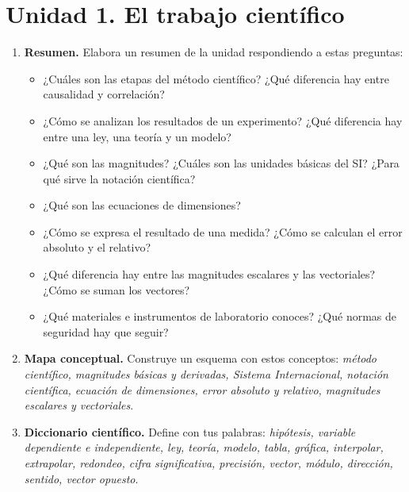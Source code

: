 
\section{Unidad 1. El trabajo científico}

\begin{enumerate}[label=\numberballred]
    \item \textbf{Resumen.} Elabora un resumen de la unidad respondiendo a estas preguntas:
    \begin{itemize}
        \item ¿Cuáles son las etapas del método científico? ¿Qué diferencia hay entre causalidad y correlación?
        \item ¿Cómo se analizan los resultados de un experimento? ¿Qué diferencia hay entre una ley, una teoría y un modelo?
        \item ¿Qué son las magnitudes? ¿Cuáles son las unidades básicas del SI? ¿Para qué sirve la notación científica?
        \item ¿Qué son las ecuaciones de dimensiones?
        \item ¿Cómo se expresa el resultado de una medida? ¿Cómo se calculan el error absoluto y el relativo?
        \item ¿Qué diferencia hay entre las magnitudes escalares y las vectoriales? ¿Cómo se suman los vectores?
        \item ¿Qué materiales e instrumentos de laboratorio conoces? ¿Qué normas de seguridad hay que seguir?
    \end{itemize}
    \item \textbf{Mapa conceptual.} Construye un esquema con estos conceptos: \emph{método científico, magnitudes básicas y derivadas, Sistema Internacional, notación científica, ecuación de dimensiones, error absoluto y relativo, magnitudes escalares y vectoriales}.
    \item \textbf{Diccionario científico.} Define con tus palabras: \emph{hipótesis, variable dependiente e independiente, ley, teoría, modelo, tabla, gráfica, interpolar, extrapolar, redondeo, cifra significativa, precisión, vector, módulo, dirección, sentido, vector opuesto}.
\end{enumerate}

